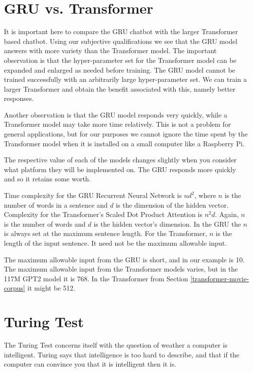 

\section{GRU vs. Transformer}
It is important here to compare the GRU chatbot with the larger Transformer based chatbot. Using our subjective qualifications we see that the GRU model answers with more variety than the Transformer model. The important observation is that the hyper-parameter set for the Transformer model can be expanded and enlarged as needed before training. The GRU model cannot be trained successfully with an arbitrarily large hyper-parameter set. We can train a larger Transformer and obtain the benefit associated with this, namely better responses.

Another observation is that the GRU model responds very quickly, while a Transformer model may take more time relatively. This is not a problem for general applications, but for our purposes we cannot ignore the time spent by the Transformer model when it is installed on a small computer like a Raspberry Pi. 

The respective value of each of the models changes slightly when you consider what platform they will be implemented on. The GRU responds more quickly and so it retains some worth.

Time complexity for the GRU Recurrent Neural Network is $ n  d^2 $, where $ n $ is the number of words in a sentence and $ d $ is the dimension of the hidden vector. Complexity for the Transformer's Scaled Dot Product Attention is $ n^2  d $. Again, $n$ is the number of words and $d$ is the hidden vector's dimension. In the GRU the $n$ is always set at the maximum sentence length. For the Transformer, $n$ is the length of the input sentence. It need not be the maximum allowable input.

The maximum allowable input from the GRU is short, and in our example is 10. The maximum allowable input from the Transformer models varies, but in the 117M GPT2 model it is 768. In the Transformer from Section \ref{transformer-movie-corpus} it might be 512. 

\section{Turing Test}

The Turing Test concerns itself with the question of weather a computer is intelligent. Turing says that intelligence is too hard to describe, and that if the computer can convince you that it is intelligent then it is.

